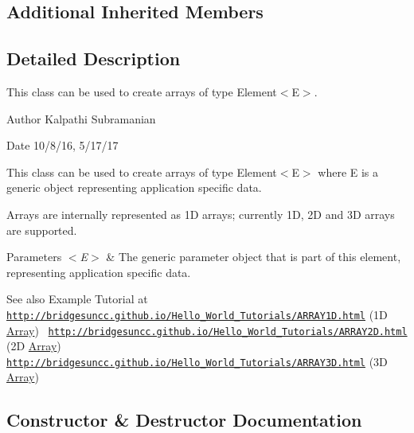 \subsection*{Additional Inherited Members}


\subsection{Detailed Description}
This class can be used to create arrays of type Element$<$\+E$>$. 

\begin{DoxyAuthor}{Author}
Kalpathi Subramanian
\end{DoxyAuthor}
\begin{DoxyDate}{Date}
10/8/16, 5/17/17
\end{DoxyDate}
This class can be used to create arrays of type Element$<$\+E$>$ where E is a generic object representing application specific data.

Arrays are internally represented as 1D arrays; currently 1D, 2D and 3D arrays are supported.


\begin{DoxyParams}{Parameters}
{\em $<$\+E$>$} & The generic parameter object that is part of this element, representing application specific data.\\
\hline
\end{DoxyParams}
\begin{DoxySeeAlso}{See also}
Example Tutorial at ~\newline
 \href{http://bridgesuncc.github.io/Hello_World_Tutorials/ARRAY1D.html}{\tt http\+://bridgesuncc.\+github.\+io/\+Hello\+\_\+\+World\+\_\+\+Tutorials/\+A\+R\+R\+A\+Y1\+D.\+html} (1D \hyperlink{classbridges_1_1base_1_1_array}{Array})~\newline
 \href{http://bridgesuncc.github.io/Hello_World_Tutorials/ARRAY2D.html}{\tt http\+://bridgesuncc.\+github.\+io/\+Hello\+\_\+\+World\+\_\+\+Tutorials/\+A\+R\+R\+A\+Y2\+D.\+html} (2D \hyperlink{classbridges_1_1base_1_1_array}{Array})~\newline
 \href{http://bridgesuncc.github.io/Hello_World_Tutorials/ARRAY3D.html}{\tt http\+://bridgesuncc.\+github.\+io/\+Hello\+\_\+\+World\+\_\+\+Tutorials/\+A\+R\+R\+A\+Y3\+D.\+html} (3D \hyperlink{classbridges_1_1base_1_1_array}{Array}) 
\end{DoxySeeAlso}


\subsection{Constructor \& Destructor Documentation}
\hypertarget{classbridges_1_1base_1_1_array_ad5dbf7bbd9811c2dac16a5c135465d4b}{}\label{classbridges_1_1base_1_1_array_ad5dbf7bbd9811c2dac16a5c135465d4b} 
